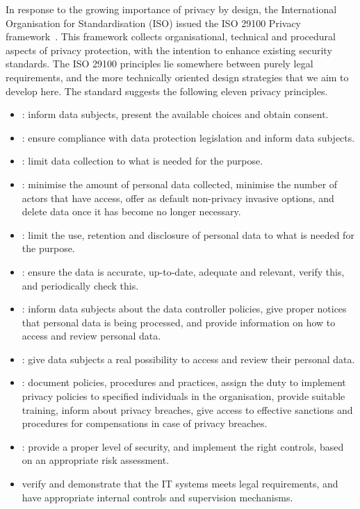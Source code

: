 In response to the growing importance of privacy by design, 
the International Organisation for Standardisation (ISO) issued the ISO 29100 Privacy framework~\cite{ISO29100}. This framework collects organisational, technical and procedural aspects of privacy protection, with the intention to enhance existing security standards. The ISO 29100 principles lie somewhere between purely legal requirements, and the more technically oriented design strategies that we aim to develop here. The standard
suggests the following eleven privacy principles.
\begin{itemize}
\item {}: inform data subjects, present the available choices and obtain consent.
\item {}: ensure compliance with data protection legislation and inform data subjects.
\item {}: limit data collection to what is needed for the purpose.
\item {}: minimise the amount of personal data collected, minimise the number of actors that have access, offer as default non-privacy invasive options, and delete data once it has become no longer necessary.
\item {}: limit the use, retention and disclosure of personal data to what is needed for the purpose.
\item {}: ensure the data is accurate, up-to-date, adequate and relevant, verify this, and periodically check this.
\item {}: inform data subjects about the data controller policies, give proper notices that personal data is being processed, and provide information on how to access and review personal data.
\item {}: give data subjects a real possibility to access and review their personal data.
\item {}: document policies, procedures and practices, assign the duty to implement privacy policies to specified individuals in the organisation, provide suitable training, inform about privacy breaches, give access to effective sanctions and procedures for compensations in case of privacy breaches.
\item {}: provide a proper level of security, and implement the right controls, based on an appropriate risk assessment.
\item {} verify and demonstrate that the IT systems meets legal requirements, and have appropriate internal controls and supervision mechanisms.
\end{itemize}
